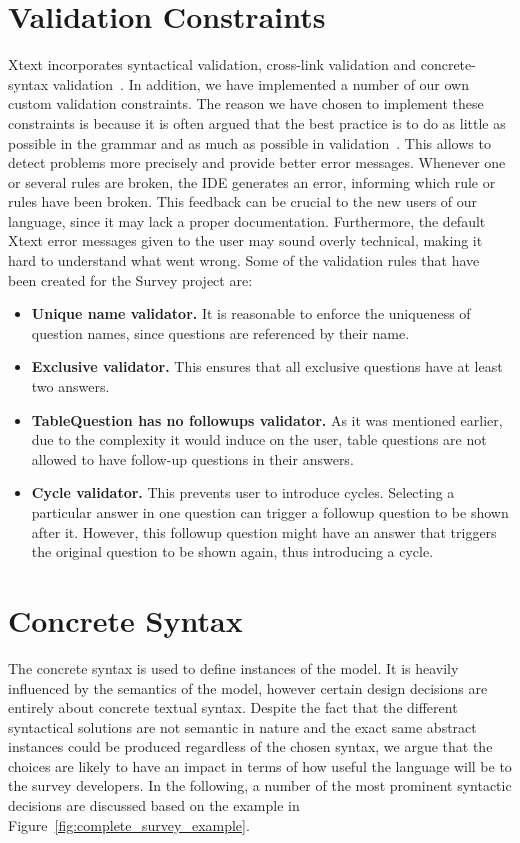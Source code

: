 \documentclass[runningheads,a4paper]{llncs}
\begin{document}
\section{Validation Constraints}
\label{sec:constraints}
Xtext incorporates syntactical validation, cross-link validation and concrete-syntax validation~\cite{xtext_doc}. In addition, we have implemented a number of our own custom validation constraints. The reason we have chosen to implement these constraints is because it is often argued that the best practice is to do as little as possible in the grammar and as much as possible in validation~\cite{bettini}. This allows to detect problems more precisely and provide better error messages. Whenever one or several rules are broken, the IDE generates an error, informing which rule or rules have been broken. This feedback can be crucial to the new users of our language, since it may lack a proper documentation. Furthermore, the default Xtext error messages given to the user may sound overly technical, making it hard to understand what went wrong.
Some of the validation rules that have been created for the Survey project are:

\begin{itemize}
	\item \textbf{Unique name validator.} It is reasonable to enforce the uniqueness of question names, since questions are referenced by their name.
	\item \textbf{Exclusive validator.} This ensures that all exclusive questions have at least two answers. 
	\item \textbf{TableQuestion has no followups validator.} As it was mentioned earlier, due to the complexity it would induce on the user, table questions are not allowed to have follow-up questions in their answers.
	\item \textbf{Cycle validator.} This prevents user to introduce cycles. Selecting a particular answer in one question can trigger a followup question to be shown after it. However, this followup question might have an answer that triggers the original question to be shown again, thus introducing a cycle. 
\end{itemize}

\section{Concrete Syntax}
The concrete syntax is used to define instances of the model. It is heavily influenced by the semantics of the model, however certain design decisions are entirely about concrete textual syntax. Despite the fact that the different syntactical solutions are not semantic in nature and the exact same abstract instances could be produced regardless of the chosen syntax, we argue that the choices are likely to have an impact in terms of how useful the language will be to the survey developers. In the following, a number of the most prominent syntactic decisions are discussed based on the example in Figure~\ref{fig:complete_survey_example}.
\end{document}
